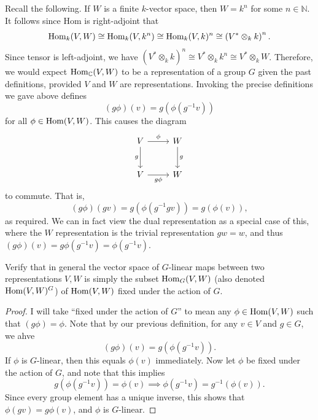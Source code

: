 Recall the following. If $W$ is a finite $k$-vector space, then $W=k^n$ for some $n\in\mathbb{N} $. It follows since Hom is right-adjoint that
\[
	\operatorname{Hom}_{k}(V, W) \cong \operatorname{Hom}_{k}(V, k^n) \cong \operatorname{Hom}_{k}(V, k)^n\cong \left( V^*\otimes_k k \right)^n
.\]
Since tensor is left-adjoint, we have $\left( V^*\otimes _kk \right) ^n\cong V^*\otimes _kk^n\cong V^*\otimes _kW$. Therefore, we would expect $\operatorname{Hom}_{\mathbb{C} }(V, W) $ to be a representation of a group $G$ given the past definitions, provided $V$ and $W$ are representations. Invoking the precise definitions we gave above defines
\[
	(g\phi )(v)=g\left( \phi \left( g^{-1} v \right)  \right) 
\]
for all $\phi \in \operatorname{Hom}(V, W)$. This causes the diagram
\[\begin{tikzcd}[row sep = 2.5em, column sep = 2.5em]
	V\arrow[r, "\phi "]\arrow[d, "g"']&W\arrow[d, "g"]\\
	V\arrow[r, "g\phi "']&W
\end{tikzcd}\]
to commute. That is,
\[
	(g\phi )(gv) = g\left( \phi \left( g^{-1} gv \right)  \right) =g\left( \phi (v) \right) 
,\]
as required. We can in fact view the dual representation as a special case of this, where the $W$ representation is the trivial representation $gw=w$, and thus $(g\phi )(v)=g\phi (g^{-1} v)=\phi (g^{-1} v)$.
\begin{exercise}
	Verify that in general the vector space of $G$-linear maps between two representations $V,W$ is simply the subset $\operatorname{Hom}_{G}(V, W) $ (also denoted $\operatorname{Hom}(V, W) ^G$) of $\operatorname{Hom}(V, W) $ fixed under the action of $G$.
\end{exercise}
\begin{proof}
	I will take ``fixed under the action of $G$'' to mean any $\phi \in \operatorname{Hom}(V, W) $ such that $(g\phi )=\phi $. Note that by our previous definition, for any $v\in V$ and $g\in G$, we ahve
	\[
		(g\phi )(v)=g(\phi (g^{-1} v))
	.\]
	If $\phi $ is $G$-linear, then this equals $\phi (v)$ immediately. Now let $\phi $ be fixed under the action of $G$, and note that this implies
	\[
		g(\phi (g^{-1} v))=\phi (v)\implies \phi (g^{-1} v)=g^{-1} (\phi (v))
	.\]
	Since every group element has a unique inverse, this shows that $\phi (gv)=g\phi (v)$, and $\phi $ is $G$-linear.
\end{proof}

